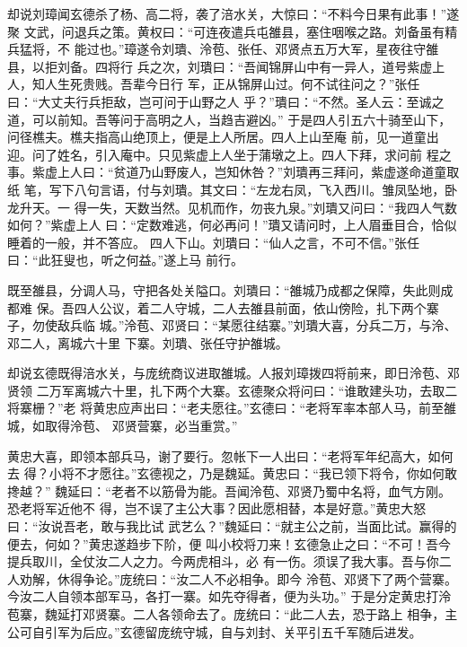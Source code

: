 却说刘璋闻玄德杀了杨、高二将，袭了涪水关，大惊曰：“不料今日果有此事！”遂聚
文武，问退兵之策。黄权曰：“可连夜遣兵屯雒县，塞住咽喉之路。刘备虽有精兵猛将，不
能过也。”璋遂令刘璝、泠苞、张任、邓贤点五万大军，星夜往守雒县，以拒刘备。四将行
兵之次，刘璝曰：“吾闻锦屏山中有一异人，道号紫虚上人，知人生死贵贱。吾辈今日行
军，正从锦屏山过。何不试往问之？”张任曰：“大丈夫行兵拒敌，岂可问于山野之人
乎？”璝曰：“不然。圣人云：至诚之道，可以前知。吾等问于高明之人，当趋吉避凶。”
于是四人引五六十骑至山下，问径樵夫。樵夫指高山绝顶上，便是上人所居。四人上山至庵
前，见一道童出迎。问了姓名，引入庵中。只见紫虚上人坐于蒲墩之上。四人下拜，求问前
程之事。紫虚上人曰：“贫道乃山野废人，岂知休咎？”刘璝再三拜问，紫虚遂命道童取纸
笔，写下八句言语，付与刘璝。其文曰：“左龙右凤，飞入西川。雏凤坠地，卧龙升天。一
得一失，天数当然。见机而作，勿丧九泉。”刘璝又问曰：“我四人气数如何？”紫虚上人
曰：“定数难逃，何必再问！”璝又请问时，上人眉垂目合，恰似睡着的一般，并不答应。
四人下山。刘璝曰：“仙人之言，不可不信。”张任曰：“此狂叟也，听之何益。”遂上马
前行。

既至雒县，分调人马，守把各处关隘口。刘璝曰：“雒城乃成都之保障，失此则成都难
保。吾四人公议，着二人守城，二人去雒县前面，依山傍险，扎下两个寨子，勿使敌兵临
城。”泠苞、邓贤曰：“某愿往结寨。”刘璝大喜，分兵二万，与泠、邓二人，离城六十里
下寨。刘璝、张任守护雒城。

却说玄德既得涪水关，与庞统商议进取雒城。人报刘璋拨四将前来，即日泠苞、邓贤领
二万军离城六十里，扎下两个大寨。玄德聚众将问曰：“谁敢建头功，去取二将寨栅？”老
将黄忠应声出曰：“老夫愿往。”玄德曰：“老将军率本部人马，前至雒城，如取得泠苞、
邓贤营寨，必当重赏。”

黄忠大喜，即领本部兵马，谢了要行。忽帐下一人出曰：“老将军年纪高大，如何去
得？小将不才愿往。”玄德视之，乃是魏延。黄忠曰：“我已领下将令，你如何敢搀越？”
魏延曰：“老者不以筋骨为能。吾闻泠苞、邓贤乃蜀中名将，血气方刚。恐老将军近他不
得，岂不误了主公大事？因此愿相替，本是好意。”黄忠大怒曰：“汝说吾老，敢与我比试
武艺么？”魏延曰：“就主公之前，当面比试。赢得的便去，何如？”黄忠遂趋步下阶，便
叫小校将刀来！玄德急止之曰：“不可！吾今提兵取川，全仗汝二人之力。今两虎相斗，必
有一伤。须误了我大事。吾与你二人劝解，休得争论。”庞统曰：“汝二人不必相争。即今
泠苞、邓贤下了两个营寨。今汝二人自领本部军马，各打一寨。如先夺得者，便为头功。”
于是分定黄忠打泠苞寨，魏延打邓贤寨。二人各领命去了。庞统曰：“此二人去，恐于路上
相争，主公可自引军为后应。”玄德留庞统守城，自与刘封、关平引五千军随后进发。

